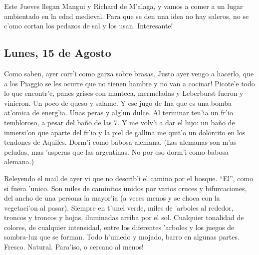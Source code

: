 Este Jueves llegan Mangui y Richard de M'alaga, y vamos a comer a un lugar
ambientado en la edad medieval. Para que se den una idea no hay saleros, no se
c'omo cortan los pedazos de sal y los usan. \textexclamdown Interesante!

\subsection*{Lunes, 15 de Agosto}

Como saben, ayer corr'i como garza sobre brasas. \textexclamdown Justo ayer
vengo a hacerlo, que a los Piaggio se les ocurre que no tienen hambre y no van a
cocinar! Picote'e todo lo que encontr'e, panes grises con manteca, mermeladas y
Leberburst fueron y vinieron. Un poco de queso y salame. Y ese jugo de Ina que
es una bomba at'omica de energ'ia. Unas peras y alg'un dulce. Al terminar ten'ia
un fr'io tembloroso, a pesar del ba\~no de las 7. Y me volv'i a dar el lujo: un
ba\~no de inmersi'on que aparte del fr'io y la piel de gallina me quit'o un
dolorcito en los tendones de Aquiles. Dorm'i como babosa alemana. (Las alemanas
son m'as peludas, mas 'asperas que las argentinas. No por eso dorm'i como babosa
alemana.)

Releyendo el mail de ayer vi que no describ'i el camino por el bosque. ``El'',
como si fuera 'unico. Son miles de caminitos unidos por varios cruces y
bifurcaciones, del ancho de una persona la mayor'ia (a veces menos y se choca
con la vegetaci'on al pasar). Siempre en t'unel verde, miles de 'arboles al
rededor, troncos y troncos y hojas, iluminadas arriba por el sol. Cualquier
tonalidad de colores, de cualquier intensidad, entre los diferentes 'arboles y
los juegos de sombra-luz que se forman. Todo h'umedo y mojado, barro en algunas
partes. Fresco. Natural. \textexclamdown Para'iso, o cercano al menos!

